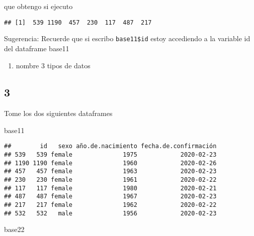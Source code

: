 \documentclass[]{article}
\newenvironment{Shaded}{\begin{snugshade}}{\end{snugshade}}
\newcommand{\StringTok}[1]{\textcolor[rgb]{0.31,0.60,0.02}{#1}}
\newcommand{\OperatorTok}[1]{\textcolor[rgb]{0.81,0.36,0.00}{\textbf{#1}}}
\newcommand{\NormalTok}[1]{#1}
\providecommand{\tightlist}{%
  \setlength{\itemsep}{0pt}\setlength{\parskip}{0pt}}
\begin{document}
que obtengo si ejecuto

\begin{Shaded}
\end{Shaded}

\begin{verbatim}
## [1]  539 1190  457  230  117  487  217
\end{verbatim}

Sugerencia: Recuerde que si escribo \texttt{base11\$id} estoy accediendo
a la variable id del dataframe base11

\begin{enumerate}
\def\labelenumi{\alph{enumi}.}
\setcounter{enumi}{4}
\tightlist
\item
  nombre 3 tipos de datos
\end{enumerate}

\subsection{3}\label{section-2}

Tome los dos siguientes dataframes

\begin{Shaded}
\begin{Highlighting}[]
\NormalTok{base11}
\end{Highlighting}
\end{Shaded}

\begin{verbatim}
##        id   sexo año.de.nacimiento fecha.de.confirmación
## 539   539 female              1975            2020-02-23
## 1190 1190 female              1960            2020-02-26
## 457   457 female              1963            2020-02-23
## 230   230 female              1961            2020-02-22
## 117   117 female              1980            2020-02-21
## 487   487 female              1967            2020-02-23
## 217   217 female              1962            2020-02-22
## 532   532   male              1956            2020-02-23
\end{verbatim}

\begin{Shaded}
\begin{Highlighting}[]
\NormalTok{base22}
\end{Highlighting}
\end{Shaded}
\end{document}
